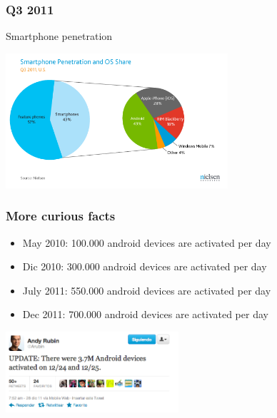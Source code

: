 \documentclass{beamer}
\begin{document}
\begin{frame}
 \frametitle{Q3 2011}

\begin{center}
\begin{large}
Smartphone penetration
\end{large}

\hspace{0.2cm}
\includegraphics[height=5.0cm]{figs/mobile_web_usage4}
\hspace{0.2cm}
\end{center}

\end{frame}

\begin{frame}
 \frametitle{More curious facts}

\begin{itemize}
\item May 2010: 100.000 android devices are activated per day
\item Dic 2010: 300.000 android devices are activated per day
\item July 2011: 550.000 android devices are activated per day
\item Dec 2011: 700.000 android devices are activated per day
\end{itemize}

\begin{center}
\hspace{0.2cm}
\includegraphics[height=3.0cm]{figs/andyrubin}
\hspace{0.2cm}
\end{center}


\end{frame}
\end{document}
